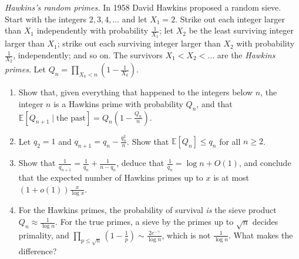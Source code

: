 \begin{exercise}[$\star\star$]\label{pb:hawkins}
\emph{Hawkins's random primes.} In 1958 David Hawkins proposed a random sieve. Start with the integers $2,3,4,\dots$ and let $X_1=2$. Strike out each integer larger than $X_1$
independently with probability $\frac1{X_1}$; let $X_2$ be the least surviving integer larger than $X_1$; strike out each surviving integer larger than $X_2$ with
probability $\frac1{X_2}$, independently; and so on. The survivors $X_1<X_2<\dots$ are the \emph{Hawkins primes}. Let $Q_n=\prod_{X_k<n}(1-\frac1{X_k})$.
\begin{enumerate}[label=(\alph*)]
\item Show that, given everything that happened to the integers below $n$, the integer $n$ is a Hawkins prime with probability $Q_n$, and that
$\mathbb E[Q_{n+1}\mid\text{the past}]=Q_n(1-\frac{Q_n}n)$.
\item Let $q_2=1$ and $q_{n+1}=q_n-\frac{q_n^2}n$. Show that $\mathbb E[Q_n]\le q_n$ for all $n\ge2$.
\item Show that $\frac1{q_{n+1}}=\frac1{q_n}+\frac1{n-q_n}$, deduce that $\frac1{q_n}=\log n+O(1)$, and conclude that the expected number of Hawkins primes up to $x$ is at most
$(1+o(1))\frac x{\log x}$.
\item For the Hawkins primes, the probability of survival \emph{is} the sieve product $Q_n\approx\frac1{\log n}$. For the true primes, a sieve by the primes up to $\sqrt n$
decides primality, and $\prod_{p\le\sqrt n}(1-\frac1p)\sim\frac{2e^{-\gamma}}{\log n}$, which is not $\frac1{\log n}$. What makes the difference?
\end{enumerate}
\end{exercise}

